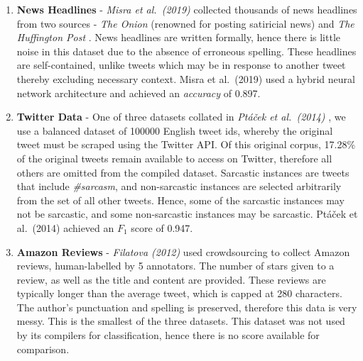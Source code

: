 \documentclass[12pt,a4paper]{article}
\begin{document}
\begin{enumerate}[leftmargin=0cm]
	\item \textbf{News Headlines} - \textit{Misra et al.\ (2019)} \cite{misra2019sarcasm} collected thousands of news headlines from two sources - \textit{The Onion} \footnotemark[3] (renowned for posting satiricial news) and \textit{The Huffington Post} \footnotemark[4]. News headlines are written formally, hence there is little noise in this dataset due to the absence of erroneous spelling. These headlines are self-contained, unlike tweets which may be in response to another tweet thereby excluding necessary context. Misra et al.\ (2019) \cite{misra2019sarcasm} used a hybrid neural network architecture and achieved an \textit{accuracy} of 0.897.
	
	\item \textbf{Twitter Data} - One of three datasets collated in \textit{Pt\'a\v{c}ek et al.\ (2014)} \cite{ptavcek2014sarcasm}, we use a balanced dataset of 100000 English tweet ids, whereby the original tweet must be scraped using the Twitter API. Of this original corpus, 17.28\% of the original tweets remain available to access on Twitter, therefore all others are omitted from the compiled dataset. Sarcastic instances are tweets that include \textit{\#sarcasm}, and non-sarcastic instances are selected arbitrarily from the set of all other tweets. Hence, some of the sarcastic instances may not be sarcastic, and some non-sarcastic instances may be sarcastic. Pt\'a\v{c}ek et al.\ (2014) \cite{ptavcek2014sarcasm} achieved an $F_{1}$ score of 0.947.
	
	\item \textbf{Amazon Reviews} - \textit{Filatova (2012)} \cite{filatova2012irony} used crowdsourcing to collect Amazon reviews, human-labelled by 5 annotators. The number of stars given to a review, as well as the title and content are provided. These reviews are typically longer than the average tweet, which is capped at 280 characters. The author's punctuation and spelling is preserved, therefore this data is very messy. This is the smallest of the three datasets. This dataset was not used by its compilers for classification, hence there is no score available for comparison.
\end{enumerate}

\end{document}
